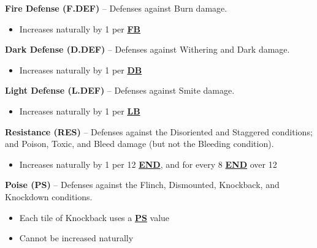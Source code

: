 \documentclass[12pt]{article}
\newcommand{\refto}[1]{\hyperlink{#1}{\textbf{#1}}}
\newcommand{\makeref}[1]{\hypertarget{#1}{\textbf{#1}}}
\begin{document}
\begin{multicols*}{2}
\textbf{Fire Defense (\makeref{F.DEF})} – Defenses against Burn damage.
\begin{itemize}
\item Increases naturally by 1 per \refto{FB}
\end{itemize}

\textbf{Dark Defense (\makeref{D.DEF})} – Defenses against Withering and Dark damage.
\begin{itemize}
\item Increases naturally by 1 per \refto{DB}
\end{itemize}

\textbf{Light Defense (\makeref{L.DEF})} – Defenses against Smite damage.
\begin{itemize}
\item Increases naturally by 1 per \refto{LB}
\end{itemize}

\textbf{Resistance (\makeref{RES})} – Defenses against the Disoriented and Staggered conditions; and Poison, Toxic, and Bleed damage (but not the Bleeding condition).
\begin{itemize}
\item Increases naturally by 1 per 12 \refto{END}, and for every 8 \refto{END} over 12
\end{itemize}

\textbf{Poise (\makeref{PS})} – Defenses against the Flinch, Dismounted, Knockback, and Knockdown conditions.
\begin{itemize}
\item Each tile of Knockback uses a \refto{PS} value
\item Cannot be increased naturally
\end{itemize}

\vspace*{\fill}
\columnbreak


\end{multicols*}
\end{document}
